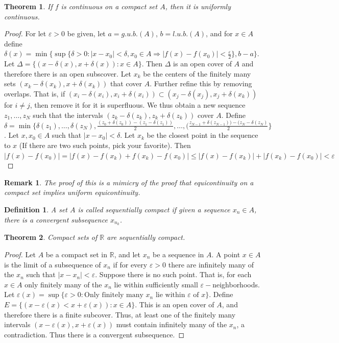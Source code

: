 \documentclass[12pt,oneside]{book}
\theoremstyle{mystyle}
\newtheorem{theorem}{Theorem}[section]
\newtheorem{definition}{Definition}[section]
\newtheorem{remark}{Remark}[section]
\begin{document}
\begin{theorem}
If $f$ is continuous on a compact set $A$, then it is uniformly continuous.
\end{theorem}
\begin{proof}
For let $\varepsilon>0$ be given, let $a=g.u.b.(A)$, $b=l.u.b.(A)$, and for $x\in A$ define $\delta(x) = \min\{\sup\{\delta>0: |x-x_0|<\delta,x_0\in A\Rightarrow |f(x)-f(x_0)|<\frac{\varepsilon}{2}\},b-a\}$. Let $\Delta = \{(x-\delta(x),x+\delta(x)):x\in A\}$. Then $\Delta$ is an open cover of $A$ and therefore there is an open subscover. Let $x_k$ be the centers of the finitely many sets $(x_k-\delta(x_k),x+\delta(x_k))$ that cover $A$. Further refine this by removing overlaps. That is, if $(x_i-\delta(x_i),x_i+\delta(x_i))\subset (x_j-\delta(x_j),x_j+\delta(x_k))$ for $i\ne j$, then remove it for it is superfluous. We thus obtain a new sequence $z_1,\hdots, z_N$ such that the intervals $(z_k-\delta(z_k),z_k+\delta(z_k))$ cover $A$. Define $\delta = \min\{\delta(z_1),\hdots,\delta(z_N), \frac{(z_0+\delta(z_0))-(z_1-\delta(z_1))}{2},\hdots,(\frac{z_{N-1}+\delta(z_{N-1}))-(z_{N}-\delta(z_{N})}{2}\}$. Let $x,x_0\in A$ such that $|x-x_0|<\delta$. Let $x_k$ be the closest point in the sequence to $x$ (If there are two such points, pick your favorite). Then $|f(x)-f(x_0)|=|f(x)-f(x_k)+f(x_k)-f(x_0)|\leq |f(x)-f(x_k)|+|f(x_k)-f(x_0)|<\varepsilon$
\end{proof}

\begin{remark}
The proof of this is a mimicry of the proof that equicontinuity on a compact set implies uniform equicontinuity.
\end{remark}

\begin{definition}
A set $A$ is called sequentially compact if given a sequence $x_n\in A$, there is a convergent subsequence $x_{n_k}$.
\end{definition}

\begin{theorem}
Compact sets of $\mathbb{R}$ are sequentially compact.
\end{theorem}
\begin{proof}
Let $A$ be a compact set in $\mathbb{R}$, and let $x_n$ be a sequence in $A$. A point $x\in A$ is the limit of a subsequence of $x_n$ if for every $\varepsilon>0$ there are infinitely many of the $x_n$ such that $|x-x_n|<\varepsilon$. Suppose there is no such point. That is, for each $x\in A$ only finitely many of the $x_n$ lie within sufficiently small $\varepsilon-$neighborhoods. Let $\varepsilon(x) = \sup\{\varepsilon>0:\textrm{Only finitely many }x_n \textrm{ lie within } \varepsilon \textrm{ of } x\}$. Define $E=\{(x-\varepsilon(x)<x+\varepsilon(x)):x\in A\}$. This is an open cover of $A$, and therefore there is a finite subcover. Thus, at least one of the finitely many intervals $(x-\varepsilon(x),x+\varepsilon(x))$ must contain infinitely many of the $x_n$, a contradiction. Thus there is a convergent subsequence.
\end{proof}
\end{document}
